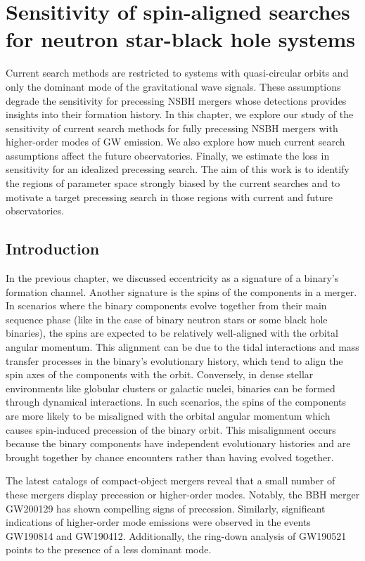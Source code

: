 \chapter{Sensitivity of spin-aligned searches for neutron star-black hole systems}

Current search methods are restricted to systems with quasi-circular orbits and only the dominant mode of the gravitational wave signals. These assumptions degrade the sensitivity for precessing NSBH mergers whose detections provides insights into their formation history. In this chapter, we explore our study of the sensitivity of current search methods for fully precessing NSBH mergers with higher-order modes of GW emission. We also explore how much current search assumptions affect the future observatories. Finally, we estimate the loss in sensitivity for an idealized precessing search.  The aim of this work is to identify the regions of parameter space strongly biased by the current searches and to motivate a target precessing search in those regions with current and future observatories.

\section{Introduction}
In the previous chapter, we discussed eccentricity as a signature of a binary's formation channel. Another signature is the spins of the components in a merger.  In scenarios where the binary components evolve together from their main sequence phase (like in the case of binary neutron stars or some black hole binaries), the spins are expected to be relatively well-aligned with the orbital angular momentum. This alignment can be due to the tidal interactions and mass transfer processes in the binary’s evolutionary history, which tend to align the spin axes of the components with the orbit. Conversely, in dense stellar environments like globular clusters or galactic nuclei, binaries can be formed through dynamical interactions. In such scenarios, the spins of the components are more likely to be misaligned with the orbital angular momentum which causes spin-induced precession of the binary orbit. This misalignment occurs because the binary components have independent evolutionary histories and are brought together by chance encounters rather than having evolved together. 

The latest catalogs of compact-object mergers reveal that a small number of these mergers display precession or higher-order modes. Notably, the BBH merger GW200129 has shown compelling signs of precession. Similarly, significant indications of higher-order mode emissions were observed in the events GW190814 and GW190412. Additionally, the ring-down analysis of GW190521 points to the presence of a less dominant mode.

